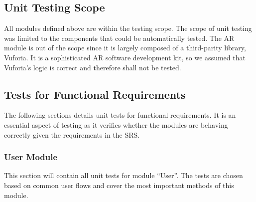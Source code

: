 \documentclass[12pt, titlepage]{article}
\begin{document}
\subsection{Unit Testing Scope}

All modules defined above are within the testing scope.  The scope of unit testing was limited to the components that could be automatically tested. The AR module is out of the scope since it is largely composed of a third-parity library, Vuforia. It is a sophisticated AR software development kit, so we assumed that Vuforia’s logic is correct and therefore shall not be tested.

\subsection{Tests for Functional Requirements}

The following sections details unit tests for functional requirements. It is an essential aspect of testing as it verifies whether the modules are behaving
correctly given the requirements in the SRS.

\subsubsection{User Module}

This section will contain all unit tests for module ``User''. The tests are chosen based on common user flows and cover the most important methods of this module.
\end{document}
